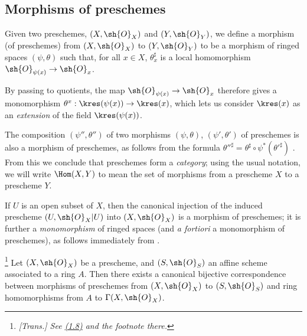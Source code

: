 \subsection{Morphisms of preschemes}
\label{subsection:I.2.2}
\label{I.2.2}

\begin{definition}[2.2.1]
\label{I.2.2.1}
Given two preschemes, $(X,\sh{O}_X)$ and $(Y,\sh{O}_Y)$, we define a morphism (of preschemes) from $(X,\sh{O}_X)$ to $(Y,\sh{O}_Y)$ to be a morphism of ringed spaces $(\psi,\theta)$ such that, for all $x\in X$, $\theta_x^\sharp$ is a local homomorphism $\sh{O}_{\psi(x)}\to\sh{O}_x$.
\end{definition}

By passing to quotients, the map $\sh{O}_{\psi(x)}\to\sh{O}_x$ therefore gives a monomorphism $\theta^x:\kres(\psi(x))\to\kres(x)$, which lets us consider $\kres(x)$ as an \emph{extension} of the field $\kres(\psi(x))$.

\begin{env}[2.2.2]
\label{I.2.2.2}
The composition $(\psi'',\theta'')$ of two morphisms $(\psi,\theta)$, $(\psi',\theta')$ of preschemes is also a morphism of preschemes, as follows from the formula ${\theta''}^\sharp=\theta^\sharp\circ\psi^*({\theta'}^\sharp)$ .
From this we conclude that preschemes form a \emph{category};
using the usual notation, we will write $\Hom(X,Y)$ to mean the set of morphisms from a prescheme $X$ to a prescheme $Y$.
\end{env}

\begin{example}[2.2.3]
\label{I.2.2.3}
If $U$ is an open subset of $X$, then the canonical injection  of the induced prescheme $(U,\sh{O}_X|U)$ into $(X,\sh{O}_X)$ is a morphism of preschemes;
it is further a \emph{monomorphism} of ringed spaces (and \emph{a fortiori} a monomorphism of preschemes), as follows immediately from .
\end{example}

\begin{proposition}[2.2.4]
\label{I.2.2.4}
\footnote{\emph{[Trans.] See \hyperref[subsection:I.1.8]{(1.8)} and the footnote there.}}
Let $(X,\sh{O}_X)$ be a prescheme, and $(S,\sh{O}_S)$ an affine scheme associated to a ring $A$.
Then there exists a canonical bijective correspondence between morphisms of preschemes from $(X,\sh{O}_X)$ to $(S,\sh{O}_S)$ and ring homomorphisms from $A$ to $\Gamma(X,\sh{O}_X)$.
\end{proposition}

